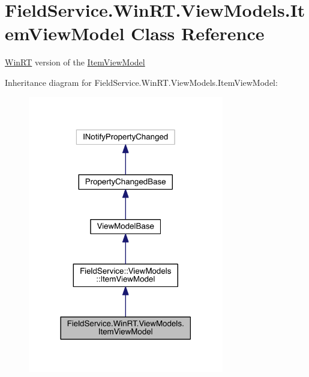 \hypertarget{class_field_service_1_1_win_r_t_1_1_view_models_1_1_item_view_model}{\section{Field\+Service.\+Win\+R\+T.\+View\+Models.\+Item\+View\+Model Class Reference}
\label{class_field_service_1_1_win_r_t_1_1_view_models_1_1_item_view_model}
}


\hyperlink{namespace_field_service_1_1_win_r_t}{Win\+R\+T} version of the \hyperlink{class_field_service_1_1_win_r_t_1_1_view_models_1_1_item_view_model}{Item\+View\+Model}  




Inheritance diagram for Field\+Service.\+Win\+R\+T.\+View\+Models.\+Item\+View\+Model\+:
\nopagebreak
\begin{figure}[H]
\begin{center}
\leavevmode
\includegraphics[width=242pt]{class_field_service_1_1_win_r_t_1_1_view_models_1_1_item_view_model__inherit__graph}
\end{center}
\end{figure}


